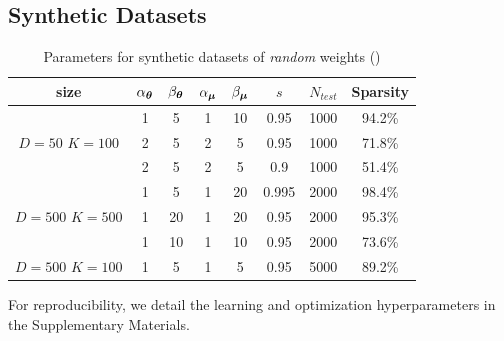 \subsection{Synthetic Datasets}
\label{sec: experiment setup}
\begin{table}[t]
\caption{\small Parameters for synthetic datasets of \emph{patterned} weights}
\label{tab: syndata}
\centering
{\small
{}
}
\end{table}
\begin{table}[t]
\caption{\small Parameters for synthetic datasets of \emph{random} weights (\sparse)}
\label{tab: syndata2}
\centering
{\small
\begin{tabular}{cccccccc}
\toprule
\small
 size & $\alpha_{\bm{\theta}}$ & $\beta_{\bm{\theta}}$ & $\alpha_{\bm{\mu}}$ & $\beta_{\bm{\mu}}$ & $s$ & $N_{test}$ & Sparsity  \\
\midrule
\multirow{3}{*}{\parbox{1.2cm}{$D=50$ $K\!=\!100$}} & 1 &	5 & 1 & 10 & 0.95 & 1000 & 94.2\% \\
  & 2 & 5 & 2 & 5 & 0.95 & 1000 & 71.8\% \\
  & 2 & 5 & 2 & 5 & 0.9 & 1000 & 51.4\% \\
\hline
\multirow{3}{*}{\parbox{1.2cm}{$D\!=\!500$ $K\!=\!500$}}& 1 & 5 & 1 & 20 & 0.995 & 2000 & 98.4\% \\
& 1 & 20 & 1 & 20	& 0.95 & 2000 & 95.3\%\\
 & 1 & 10 & 1 & 10 & 0.95 & 2000 & 73.6\% \\
\hline
\parbox{1.2cm}{$D\!=\!500$ $K\! =\!100$} & 1 & 5 & 1 & 5 & 0.95 & 5000 & 89.2\% \\
\bottomrule
\end{tabular}
}
\vspace{-1em}
\end{table}

For reproducibility, we detail the learning and optimization hyperparameters in the Supplementary Materials. 
